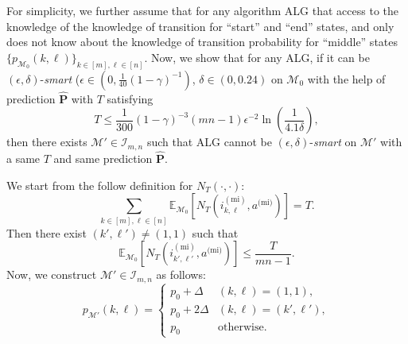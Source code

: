 \documentclass[12pt]{article}
\begin{document}
For simplicity, we further assume that for any algorithm ALG that access to the knowledge of the knowledge of transition for ``start'' and ``end'' states, and only does not know about the knowledge of transition probability for ``middle'' states $\{p_{\mathcal{M}_0}(k,\ell)\}_{k \in [m], \ell \in [n]}$.
Now, we show that for any ALG, if it can be $(\epsilon,\delta)$-\textit{smart} ($\epsilon \in (0, \frac{1}{40} (1-\gamma)^{-1})$, $\delta \in (0, 0.24)$ on $\mathcal{M}_0$ with the help of prediction $\hat{\boldsymbol{\text{P}}}$ with $T$ satisfying
\begin{equation*}
    T \le \frac{1}{300}(1-\gamma)^{-3} (mn-1) \epsilon^{-2} \ln\left(\frac{1}{4.1\delta}\right),
\end{equation*}
then there exists $\mathcal{M}' \in \mathcal{I}_{m,n}$ such that ALG cannot be $(\epsilon,\delta)$-\textit{smart} on $\mathcal{M}' $ with a same $T$ and same prediction $\hat{\boldsymbol{\text{P}}}$.

We start from the follow definition for $N_T(\cdot,\cdot)$:
\begin{equation*}
    \sum_{k \in [m],\ell \in[n]}\mathbb{E}_{\mathcal{M}_0} [N_T(i^{(\text{mi})}_{k,\ell},a^{\text{(mi)}})] = T.
\end{equation*}
Then there exist $(k',\ell') \ne (1,1)$ such that
\begin{equation*}
    \mathbb{E}_{\mathcal{M}_0} [N_T(i^{(\text{mi})}_{k',\ell'},a^{\text{(mi)}})] \le \frac{T}{mn-1}.
\end{equation*}
Now, we construct $\mathcal{M}' \in \mathcal{I}_{m,n}$ as follows:
\begin{equation*}
    p_{\mathcal{M}'}(k,\ell) = \begin{cases}
        p_0 + \Delta & (k,\ell) = (1,1), \\
        p_0 + 2 \Delta & (k,\ell) = (k',\ell'),\\
        p_0 & \text{otherwise.}
    \end{cases}
\end{equation*}
\end{document}
